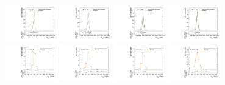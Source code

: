 \begin{figure}[htpb]
  \includegraphics[width=0.2\textwidth]{fig/2Dfit/templateVsReco_GbuToWW2000_r0_MVV_mu_HP_vbf_LDy_linear.pdf}
  \includegraphics[width=0.2\textwidth]{fig/2Dfit/templateVsReco_GbuToWW2000_r0_MVV_mu_LP_vbf_LDy_linear.pdf}
  \includegraphics[width=0.2\textwidth]{fig/2Dfit/templateVsReco_GbuToWW2000_r0_MVV_mu_HP_vbf_HDy_linear.pdf}
  \includegraphics[width=0.2\textwidth]{fig/2Dfit/templateVsReco_GbuToWW2000_r0_MVV_mu_LP_vbf_HDy_linear.pdf}\\
  \includegraphics[width=0.2\textwidth]{fig/2Dfit/templateVsReco_GbuToWW2000_r0_MJ_mu_HP_bb_LDy.pdf}
  \includegraphics[width=0.2\textwidth]{fig/2Dfit/templateVsReco_GbuToWW2000_r0_MJ_mu_LP_bb_LDy.pdf}
  \includegraphics[width=0.2\textwidth]{fig/2Dfit/templateVsReco_GbuToWW2000_r0_MJ_mu_HP_bb_HDy.pdf}
  \includegraphics[width=0.2\textwidth]{fig/2Dfit/templateVsReco_GbuToWW2000_r0_MJ_mu_LP_bb_HDy.pdf}\\

\end{figure}
